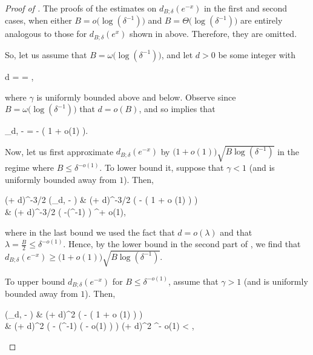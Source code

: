 \documentclass[10pt,a4paper]{article}
\theoremstyle{plain}\newtheorem{theorem}{Theorem}
\theoremstyle{definition}
\begin{document}
	\begin{proof}[Proof of ]
	
	The proofs of the estimates on $d_{B; \delta} (e^{-x})$ in the first and second cases, when either $B = o \big( \log (\delta^{-1}) \big)$ and $B = \Theta \Big( \log (\delta^{-1}) \Big)$ are entirely analogous to those for $d_{B; \delta} (e^x)$ shown in  above. Therefore, they are omitted.
	
	So, let us assume that $B = \omega \big( \log (\delta^{-1}) \big)$, and let $d > 0$ be some integer with 
	\begin{flalign*}
	d =  = ,
	\end{flalign*}
	
	\noindent where $\gamma$ is uniformly bounded above and below. Observe since $B = \omega \big( \log (\delta^{-1}) \big)$ that $d = o (B)$, and so  implies that 
	\begin{flalign*}
	\Psi_{d, \lambda} - \lambda = -\displaystyle{} \big( 1 + o(1) \big).
	\end{flalign*}
	
	Now, let us first approximate $d_{B; \delta} (e^{-x})$ by $( 1 + o(1) \big) \sqrt{B \log (\delta^{-1})}$ in the regime where $B \le \delta^{-o(1)}$. To lower bound it, suppose that $\gamma < 1$ (and is uniformly bounded away from $1$). Then, 
	\begin{flalign*}
	(\lambda + d)^{-3/2} \exp (\Psi_{d, \lambda} - \lambda) & \ge (\lambda + d)^{-3/2} \exp \Big( -\displaystyle{} \big( 1 + o (1) \big) \Big) \\
	& \ge (\lambda + d)^{-3/2} \exp \Big( -\gamma \log (\delta^{-1}) \Big) \ge \delta^{\gamma + o(1)},
	\end{flalign*}
	
	\noindent where in the last bound we used the fact that $d = o (\lambda)$ and that $\lambda = \frac{B}{2} \le \delta^{-o(1)}$. Hence, by the lower bound in the second part of , we find that $d_{B; \delta} (e^{-x}) \ge \big( 1 + o (1) \big) \sqrt{ B \log (\delta^{-1})}$.
	
	To upper bound $d_{B; \delta} (e^{-x})$ for $B \le \delta^{-o(1)}$, assume that $\gamma > 1$ (and is uniformly bounded away from $1$). Then,
	\begin{flalign*}
	\exp (\Psi_{d, \lambda} - \lambda) & \le (\lambda + d)^2 \exp \Big( -\displaystyle{} \big( 1 + o (1) \big) \Big) \\
	& \le (\lambda + d)^2 \exp \Big( - \log (\delta^{-1}) \big( \gamma - o(1) \big) \Big) \le (\lambda + d)^2 \delta^{\gamma - o(1)} < \delta,
	\end{flalign*}
	

\end{proof}
\end{document}
